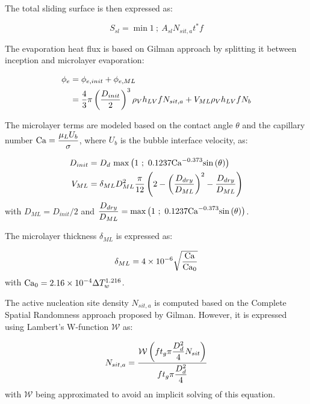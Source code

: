 \npar

The total sliding surface is then expressed as:

\begin{equation}
S_{sl} = \min{1\ ;\ A_{sl}N_{sit,a}t^{*}f}
\end{equation}

The evaporation heat flux is based on Gilman approach by splitting it between inception and microlayer evaporation:

\begin{align}
\phi_{e} &= \phi_{e,init} + \phi_{e,ML} \\
&= \frac{4}{3}\pi \left( \frac{D_{init}}{2} \right)^{3}\rho_{V} h_{LV} f N_{sit,a} + V_{ML} \rho_{V} h_{LV} f N_{b}
\end{align}


The microlayer terms are modeled based on the contact angle $\theta$ and the capillary number $\mathrm{Ca} = \dfrac{\mu_{L} U_{b}}{\sigma}$, where $U_{b}$ is the bubble interface velocity, as:

\begin{align}
D_{init} &= D_{d}~ \mathrm{max}\left( 1\ ;\ 0.1237\mathrm{Ca}^{-0.373}\mathrm{sin}\left( \theta \right) \right)\\
V_{ML} &= \delta_{ML}D_{ML}^{2} \frac{\pi}{12} \left( 2 - \left( \frac{D_{dry}}{D_{ML}} \right)^{2} - \frac{D_{dry}}{D_{ML}} \right)
\end{align}
with $D_{ML} = D_{init} / 2$ and $\dfrac{D_{dry}}{D_{ML}} = \max{1\ ;\ 0.1237\Ca^{-0.373}\sin{\theta}}$.

\npar

The microlayer thickness $\delta_{ML}$ is expressed as:

\begin{equation}
\delta_{ML}= 4 \times 10^{-6} \sqrt{\frac{\mathrm{Ca}}{\mathrm{Ca}_{0}}}
\end{equation}
with $\mathrm{Ca}_{0} = 2.16 \times 10^{-4} \Delta T_{w}^{1.216}$.


\npar

The active nucleation site density $N_{sit,a}$ is computed based on the Complete Spatial Randomness approach proposed by Gilman. However, it is expressed using Lambert's W-function $\mathcal{W}$ as:

\begin{equation}
N_{sit,a} = \frac{\mathcal{W}\left( f t_{g} \pi \dfrac{D_{d}^{2}}{4} N_{sit} \right)}{f t_{g} \pi \dfrac{D_{d}^{2}}{4}}
\end{equation}
with $\mathcal{W}$ being approximated to avoid an implicit solving of this equation.



